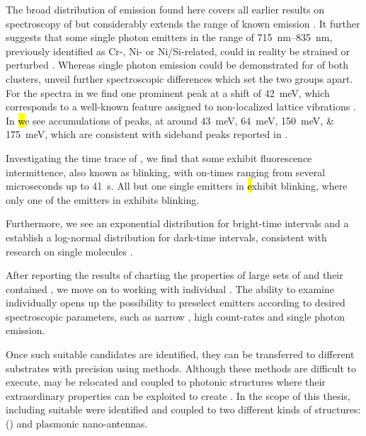    The broad distribution of emission \wls found here covers all earlier results on spectroscopy of \sivs but considerably extends the range of known emission \wls. It further suggests that some single photon emitters in the range of \SIrange{715}{835}{\nm}, previously identified as Cr-, Ni- or Ni/Si-related, could in reality be strained or perturbed \sivs. Whereas single photon emission could be demonstrated for \sivc of both clusters, unveil further spectroscopic differences which set the two groups apart. For the \psb spectra in \vl we find one prominent peak at a shift of \SI{42}{meV}, which corresponds to a well-known feature assigned to non-localized lattice vibrations \cite{Larkins1971,Sternschulte1994}.
   In \hl we see accumulations of peaks, at around \SIlist{43;64;150;175}{meV}, which are consistent with sideband peaks reported in \cite{Sternschulte1994,Zaitsev2001,Neu2011}.

   Investigating the time trace of \siv \pl, we find that some \sivs exhibit fluorescence intermittence, also known as blinking, with on-times ranging from several microseconds up to \SI{41}{s}. All but one single emitters in \hl exhibit blinking, where only one of the emitters in \vl exhibits blinking.

   Furthermore, we see an exponential distribution for bright-time intervals and a establish a log-normal distribution for dark-time intervals, consistent with research on single molecules \cite{Wong2013}.


   After reporting the results of charting the properties of large sets of \nds and their contained \sivs, we move on to working with individual \nds.
   The ability to examine \sivs individually opens up the possibility to preselect emitters according to desired spectroscopic parameters, such as narrow \lws, high count-rates and single photon emission.

   Once such suitable candidates are identified, they can be transferred to different substrates with precision using \pp methods. Although these methods are difficult to execute, \sivs may be relocated and coupled to photonic structures where their extraordinary properties can be exploited to create \spss. In the scope of this thesis, \nds including suitable \sivs were identified and coupled to two different kinds of structures: \Vcsels (\VCSELs) and plasmonic nano-antennas.

